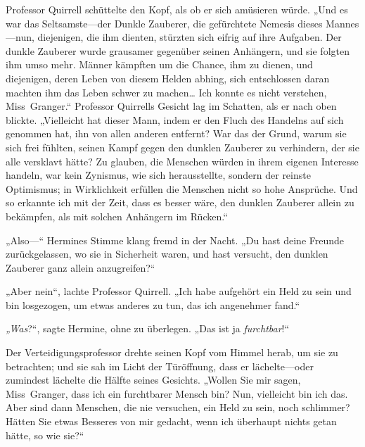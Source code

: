 Professor Quirrell schüttelte den Kopf, als ob er sich amüsieren würde.
„Und es war das Seltsamste—der Dunkle Zauberer, die gefürchtete Nemesis dieses Mannes—nun, diejenigen, die ihm dienten, stürzten sich eifrig auf ihre Aufgaben. Der dunkle Zauberer wurde grausamer gegenüber seinen Anhängern, und sie folgten ihm umso mehr. Männer kämpften um die Chance, ihm zu dienen, und diejenigen, deren Leben von diesem Helden abhing, sich entschlossen daran machten ihm das Leben schwer zu machen… Ich konnte es nicht verstehen, Miss~Granger.“
Professor Quirrells Gesicht lag im Schatten, als er nach oben blickte.
„Vielleicht hat dieser Mann, indem er den Fluch des Handelns auf sich genommen hat, ihn von allen anderen entfernt? War das der Grund, warum sie sich frei fühlten, seinen Kampf gegen den dunklen Zauberer zu verhindern, der sie alle versklavt hätte? Zu glauben, die Menschen würden in ihrem eigenen Interesse handeln, war kein Zynismus, wie sich herausstellte, sondern der reinste Optimismus; in Wirklichkeit erfüllen die Menschen nicht so hohe Ansprüche. Und so erkannte ich mit der Zeit, dass es besser wäre, den dunklen Zauberer allein zu bekämpfen, als mit solchen Anhängern im Rücken.“

„Also—“ Hermines Stimme klang fremd in der Nacht. „Du hast deine Freunde zurückgelassen, wo sie in Sicherheit waren, und hast versucht, den dunklen Zauberer ganz allein anzugreifen?“

„Aber nein“, lachte Professor Quirrell. „Ich habe aufgehört ein Held zu sein und bin losgezogen, um etwas anderes zu tun, das ich angenehmer fand.“

\emph{„Was}?“, sagte Hermine, ohne zu überlegen. „Das ist ja \emph{furchtbar}!“

Der Verteidigungsprofessor drehte seinen Kopf vom Himmel herab, um sie zu betrachten; und sie sah im Licht der Türöffnung, dass er lächelte—oder zumindest lächelte die Hälfte seines Gesichts.
„Wollen Sie mir sagen, Miss~Granger, dass ich ein furchtbarer Mensch bin? Nun, vielleicht bin ich das. Aber sind dann Menschen, die nie versuchen, ein Held zu sein, noch schlimmer? Hätten Sie etwas Besseres von mir gedacht, wenn ich überhaupt nichts getan hätte, so wie sie?“

